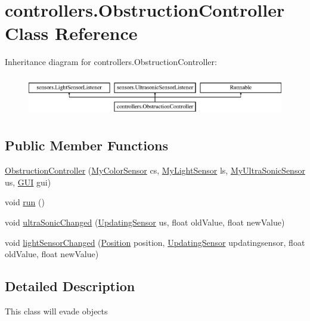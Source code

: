 \hypertarget{classcontrollers_1_1_obstruction_controller}{\section{controllers.\-Obstruction\-Controller Class Reference}
\label{classcontrollers_1_1_obstruction_controller}
}
Inheritance diagram for controllers.\-Obstruction\-Controller\-:\begin{figure}[H]
\begin{center}
\leavevmode
\includegraphics[height=1.786284cm]{classcontrollers_1_1_obstruction_controller}
\end{center}
\end{figure}
\subsection*{Public Member Functions}
\begin{DoxyCompactItemize}
\item 
\hyperlink{classcontrollers_1_1_obstruction_controller_a68a1a050f3f7a25a6b11565a1a19386d}{Obstruction\-Controller} (\hyperlink{classsensors_1_1_my_color_sensor}{My\-Color\-Sensor} cs, \hyperlink{classsensors_1_1_my_light_sensor}{My\-Light\-Sensor} ls, \hyperlink{classsensors_1_1_my_ultra_sonic_sensor}{My\-Ultra\-Sonic\-Sensor} us, \hyperlink{classgui_1_1_g_u_i}{G\-U\-I} gui)
\item 
void \hyperlink{classcontrollers_1_1_obstruction_controller_ab6f90766f733da01b7022b32f55b9d50}{run} ()
\item 
void \hyperlink{classcontrollers_1_1_obstruction_controller_a3b97c6803b754642db14268a7f0ce170}{ultra\-Sonic\-Changed} (\hyperlink{interfacesensors_1_1_updating_sensor}{Updating\-Sensor} us, float old\-Value, float new\-Value)
\item 
void \hyperlink{classcontrollers_1_1_obstruction_controller_ae8627b8e53bd16dcefeb5b84dfc55ee5}{light\-Sensor\-Changed} (\hyperlink{enumsensors_1_1_position}{Position} position, \hyperlink{interfacesensors_1_1_updating_sensor}{Updating\-Sensor} updatingsensor, float old\-Value, float new\-Value)
\end{DoxyCompactItemize}


\subsection{Detailed Description}
This class will evade objects

